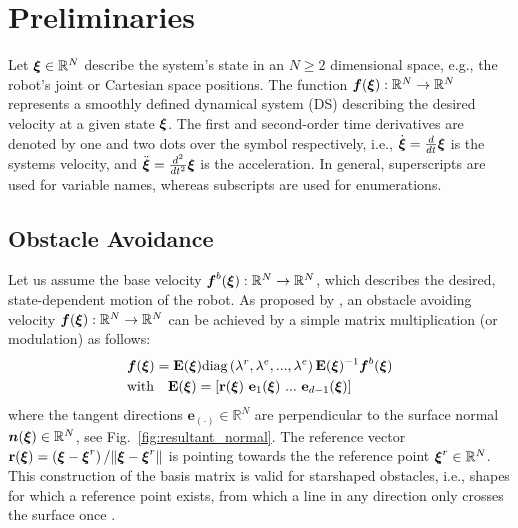 \section{Preliminaries}
Let $\boldsymbol{\xi} \in \mathbb{R}^N$ describe the system's state in an $N \geq 2$ dimensional space, e.g., the robot's joint or Cartesian space positions.
The function $\boldsymbol{f}(\boldsymbol{\xi}): \mathbb{R}^N \rightarrow \mathbb{R}^N$ represents a smoothly defined dynamical system (DS) describing the desired velocity at a given state $\boldsymbol{\xi}$.  
The first and second-order time derivatives are denoted by one and two dots over the symbol respectively, i.e., $\dot{\boldsymbol{\xi}} =\frac{d}{dt} \boldsymbol{\xi}$ is the systems velocity, and $\ddot{\boldsymbol{\xi}} = \frac{d^2}{dt^2} \boldsymbol{\xi}$ is the acceleration.
In general, superscripts are used for variable names, whereas subscripts are used for enumerations.

\subsection{Obstacle Avoidance}
Let us assume the base velocity $\boldsymbol{f}^b(\boldsymbol{\xi}): \mathbb{R}^N \rightarrow \mathbb{R}^N$, which describes the desired, state-dependent motion of the robot. 
As proposed by \cite{huber2019avoidance, huber2022avoiding}, an obstacle avoiding velocity $\boldsymbol{f}(\boldsymbol{\xi}): \mathbb{R}^N \rightarrow \mathbb{R}^N$ can be achieved by a simple matrix multiplication (or modulation) as follows:
\begin{equation}
\begin{split}
  & \vecs f(\vecs \xi) = \textbf{E}(\vecs \xi) \text{diag} \left(\lambda^r, \lambda^e, ..., \lambda^e \right) \textbf{E}(\vecs{\xi})^{-1} \vect f^b(\vecs \xi) \\
%
& \text{with} \quad
\textbf{E}(\vecs \xi) = \left[ \textbf{r}(\vecs \xi) \ \textbf{e}_1(\vecs \xi) \ ... \ \textbf{e}_{d-1}(\vecs \xi) \right]
\end{split}
  \label{eq:modulated_ds}
\end{equation}
where the tangent directions $\textbf{e}_{(\cdot)} \in \mathbb{R}^N$ are perpendicular to the surface normal $\boldsymbol{n}(\boldsymbol{\xi}) \in \mathbb{R}^N$, see Fig.~\ref{fig:resultant_normal}. The reference vector $\textbf{r}(\boldsymbol{\xi}) =  \left( \boldsymbol{\xi}-\boldsymbol{\xi}^r \right) / \| \boldsymbol{\xi}-\boldsymbol{\xi} ^r \|$ is pointing towards the the reference point $\boldsymbol{\xi}^r \in \mathbb{R}^N$. 
This construction of the basis matrix is valid for starshaped obstacles, i.e., shapes for which a reference point exists, from which a line in any direction only crosses the surface once \cite{huber2023avoidance}.

